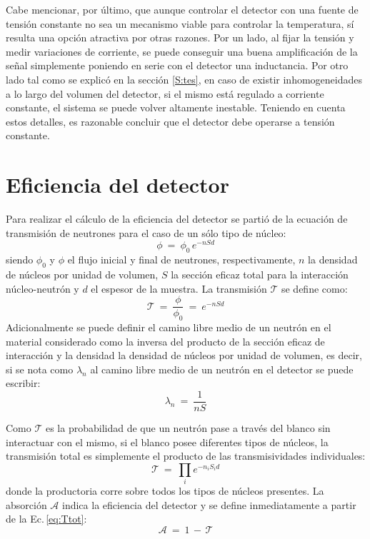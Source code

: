 Cabe mencionar, por último, que aunque controlar el detector con una fuente de tensión constante no sea un mecanismo viable para controlar la temperatura, sí resulta una opción atractiva por otras razones. Por un lado, al fijar la tensión y medir variaciones de corriente, se puede conseguir una buena amplificación de la señal simplemente poniendo en serie con el detector una inductancia\cite{Ishida2008}. Por otro lado tal como se explicó en la sección \ref{S:tes}, en caso de existir inhomogeneidades a lo largo del volumen del detector, si el mismo está regulado a corriente constante, el sistema se puede volver altamente inestable. Teniendo en cuenta estos detalles, es razonable concluir que el detector debe operarse a tensión constante.
\section{Eficiencia del detector}\label{S:eficiencia}
Para realizar el cálculo de la eficiencia del detector se partió de la ecuación de transmisión de neutrones para el caso de un sólo tipo de núcleo\cite{knoll}:
\begin{equation}
 \phi \ = \ \phi_0 \, e^{-n S d}
  \label{eq:t1}
\end{equation}
\noindent
siendo $\phi_0$ y $\phi$ el flujo inicial y final de neutrones, respectivamente, $n$ la densidad de núcleos por unidad de volumen, $S$ la sección eficaz total para la interacción núcleo-neutrón y $d$ el espesor de la muestra. La transmisión $\mathcal{T}$ se define como:
\begin{equation}
 \mathcal{T} \ = \ \frac{\phi}{\phi_0} \ = \ e^{-n S d}
  \label{eq:T}
\end{equation}
\noindent
Adicionalmente se puede definir el camino libre medio de un neutrón en el material considerado como la inversa del producto de la sección eficaz de interacción y la densidad la densidad de núcleos por unidad de volumen, es decir, si se nota como $\lambda_n$ al camino libre medio de un neutrón en el detector se puede escribir:
\begin{equation}
 \lambda_n \ = \ \frac{1}{n S}
  \label{eq:camino}
\end{equation}

Como $\mathcal{T}$ es la probabilidad de que un neutrón pase a través del blanco sin interactuar con el mismo, si el blanco posee diferentes tipos de núcleos, la transmisión total es simplemente el producto de las transmisividades individuales:
\begin{equation}
 \mathcal{T} \ = \ \prod _i e^{-n_i S_i d}
\label{eq:Ttot}
\end{equation}
\noindent
donde la productoria corre sobre todos los tipos de núcleos presentes. La absorción $\mathcal{A}$ indica la eficiencia del detector y se define inmediatamente a partir de la Ec.\,\ref{eq:Ttot}:
\begin{equation}
 \mathcal{A} \ = \ 1 \, - \, \mathcal{T}
\label{eq:A}
\end{equation}

